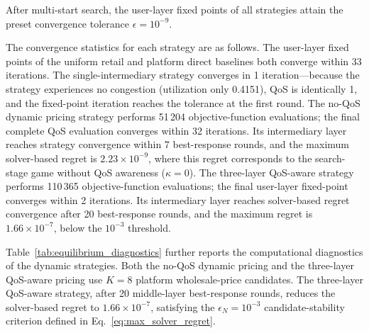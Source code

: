 \documentclass[11pt,a4paper]{article}
\begin{document}
After multi-start search, the user-layer fixed points of all strategies attain the preset convergence tolerance $\epsilon=10^{-9}$.

The convergence statistics for each strategy are as follows. The user-layer fixed points of the uniform retail and platform direct baselines both converge within 33 iterations. The single-intermediary strategy converges in 1 iteration---because the strategy experiences no congestion (utilization only 0.4151), QoS is identically 1, and the fixed-point iteration reaches the tolerance at the first round. The no-QoS dynamic pricing strategy performs 51\,204 objective-function evaluations; the final complete QoS evaluation converges within 32 iterations. Its intermediary layer reaches strategy convergence within 7 best-response rounds, and the maximum solver-based regret is $2.23\times10^{-9}$, where this regret corresponds to the search-stage game without QoS awareness ($\kappa=0$). The three-layer QoS-aware strategy performs 110\,365 objective-function evaluations; the final user-layer fixed-point converges within 2 iterations. Its intermediary layer reaches solver-based regret convergence after 20 best-response rounds, and the maximum regret is $1.66\times10^{-7}$, below the $10^{-3}$ threshold.

Table~\ref{tab:equilibrium_diagnostics} further reports the computational diagnostics of the dynamic strategies. Both the no-QoS dynamic pricing and the three-layer QoS-aware pricing use $K=8$ platform wholesale-price candidates. The three-layer QoS-aware strategy, after 20 middle-layer best-response rounds, reduces the solver-based regret to $1.66\times10^{-7}$, satisfying the $\epsilon_N=10^{-3}$ candidate-stability criterion defined in Eq.~\eqref{eq:max_solver_regret}.

\begin{table}[H]
\centering
\caption{Three-layer candidate diagnostics for dynamic strategies. Regret is the maximum unilateral-improvement diagnostic computed by the SLSQP best-response routine according to Eq.~\eqref{eq:max_solver_regret}; the regret of the no-QoS dynamic pricing corresponds to its search game with $\kappa=0$.}
\label{tab:equilibrium_diagnostics}
\small
{}
\end{table}
\end{document}
